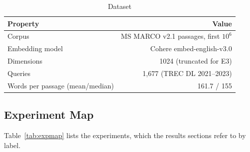 \documentclass[preprint,12pt]{elsarticle}
\begin{document}
\begin{table}[h]
  \caption{Dataset}
  \label{tab:dataset}
  \small
  \begin{tabular}{lr}
    \toprule
    Property & Value \\
    \midrule
    Corpus & MS MARCO v2.1 passages, first $10^6$ \\
    Embedding model & Cohere embed-english-v3.0 \\
    Dimensions & 1024 (truncated for E3) \\
    Queries & 1{,}677 (TREC DL 2021--2023) \\
    Words per passage (mean/median) & 161.7 / 155 \\
    \bottomrule
  \end{tabular}
\end{table}

\subsection{Experiment Map}

Table~\ref{tab:expmap} lists the experiments, which the results sections refer to by
label.
\end{document}
